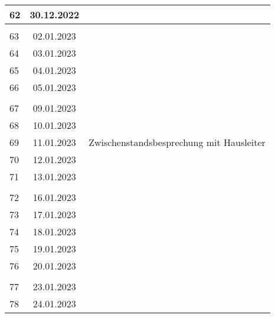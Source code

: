 \begin{longtable}{|l|c|l|}
62  & 30.12.2022    &                                                       \\ \hline 
&               &                                                       \\ \hline 
63  & 02.01.2023    &                                                       \\ \hline 
64  & 03.01.2023    &                                                       \\ \hline 
65  & 04.01.2023    &                                                       \\ \hline 
66  & 05.01.2023    &                                                       \\ \hline 
&               &                                                       \\ \hline 
67  & 09.01.2023    &                                                       \\ \hline 
68  & 10.01.2023    &                                                       \\ \hline 
69  & 11.01.2023    &  Zwischenstandsbesprechung mit Hausleiter                                                      \\ \hline 
70  & 12.01.2023    &                                                       \\ \hline 
71  & 13.01.2023    &                                                       \\ \hline 
&               &                                                       \\ \hline 
72  & 16.01.2023    &                                                       \\ \hline 
73  & 17.01.2023    &                                                       \\ \hline 
74  & 18.01.2023    &                                                       \\ \hline 
75  & 19.01.2023    &                                                       \\ \hline 
76  & 20.01.2023    &                                                       \\ \hline
&               &                                                       \\ \hline  
77  & 23.01.2023    &                                                       \\ \hline 
78  & 24.01.2023    &                                                       \\ \hline 

\end{longtable}
